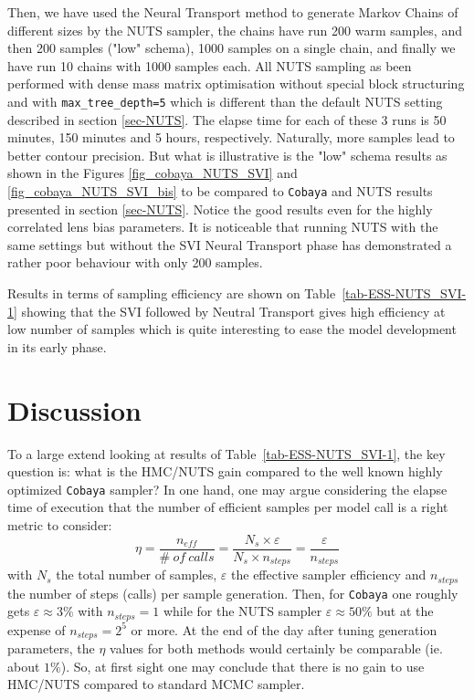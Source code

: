 \documentclass[twocolumn,twocolappendix,nofootinbib,iop]{openjournal}
\begin{document}
Then, we have used the Neural Transport method to generate Markov Chains of different sizes by the NUTS sampler, the chains have run 200 warm samples, and then 200 samples ("low" schema), 1000 samples on a single chain, and finally we have run 10 chains  with 1000 samples each. All NUTS sampling as been performed with dense mass matrix optimisation without special block structuring and with \texttt{max\_tree\_depth=5} which is different than the default NUTS setting described in section \ref{sec-NUTS}. The elapse time for each of these 3 runs is 50 minutes, 150 minutes and 5 hours, respectively. Naturally, more samples lead to better contour precision. But what is illustrative is the "low" schema results as shown in the Figures \ref{fig_cobaya_NUTS_SVI} and \ref{fig_cobaya_NUTS_SVI_bis}  to be compared to \texttt{Cobaya} and NUTS results presented in section \ref{sec-NUTS}. Notice the good results even for the highly correlated lens bias parameters. It is noticeable that running NUTS with the same settings  but without the SVI Neural Transport phase has demonstrated a rather poor behaviour with only 200 samples.  

Results in terms of sampling efficiency are shown on Table~\ref{tab-ESS-NUTS_SVI-1} showing that the SVI followed by Neutral Transport gives high efficiency at low number of samples which is quite interesting to ease the model development in its early phase.
%
\section{Discussion}
\label{sec-discussion}
%
To a large extend looking at results of Table~\ref{tab-ESS-NUTS_SVI-1}, the key question is: what is the HMC/NUTS gain compared to the well known highly optimized \texttt{Cobaya} sampler? 
In one hand, one may argue considering the elapse time of execution that the number of efficient samples per model call is a right metric to consider: 
\begin{equation}
    \eta = \frac{n_{eff}}{\#\ of\ calls} = \frac{N_s \times \varepsilon}{N_s \times n_{steps}} = \frac{\varepsilon}{n_{steps}}
\end{equation}
with $N_s$ the total number of samples, $\varepsilon$ the effective sampler efficiency  and $n_{steps}$ the number of steps (calls) per sample generation. Then, for \texttt{Cobaya} one roughly gets $\varepsilon\approx 3\%$ with $n_{steps}=1$ while for the NUTS sampler $\varepsilon\approx 50\%$ but at the expense of $n_{steps}=2^5$ or more. At the end of the day after tuning generation parameters, the $\eta$ values for both methods would certainly be comparable (ie. about $1\%$). So, at first sight one may conclude that there is no gain to use HMC/NUTS compared to standard MCMC sampler.  
\end{document}
